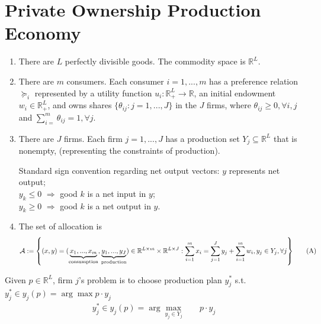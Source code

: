 \documentclass[11pt]{elegantbook}
\begin{document}
\section{Private Ownership Production Economy}
\begin{enumerate}
    \item There are $L$ perfectly divisible goods. The commodity space is $\mathbb{R}^L$.
    \item There are $m$ consumers. Each consumer $i=1,...,m$ has a preference relation $\succeq_i$ represented by a utility function $u_i: \mathbb{R}_+^L \rightarrow \mathbb{R}$, an initial endowment $w_i\in \mathbb{R}_+^L$, and owns shares $\{\theta_{ij}:j=1,...,J\}$ in the $J$ firms, where $\theta_{ij}\geq 0, \forall i,j$ and $\sum_{i=}^m\theta_{ij}=1, \forall j$.
    \item There are $J$ firms. Each firm $j=1,...,J$ has a production set $Y_j\subseteq \mathbb{R}^L$ that is nonempty, (representing the constraints of production).
    \begin{note}
        Standard sign convention regarding net output vectors: $y$ represents net output;\\
        $y_k\leq 0$ $\Rightarrow$ good $k$ is a net input in $y$;\\
        $y_k\geq 0$ $\Rightarrow$ good $k$ is a net output in $y$.
    \end{note}
    \item The set of allocation is
    \begin{equation}
        \begin{aligned}
            \mathcal{A}:=\left\{(x,y)=(\underbrace{x_1,...,x_m}_\textnormal{consumption},\underbrace{y_1,...,y_J}_\textnormal{production})\in \mathbb{R}^{L\times m}\times \mathbb{R}^{L\times J}: \sum_{i=1}^mx_i=\sum_{j=1}^J y_j+\sum_{i=1}^mw_i,y_j\in Y_j, \forall j\right\}
        \end{aligned}
        \tag{A}
        \label{A}
    \end{equation}
\end{enumerate}
Given $p\in \mathbb{R}^L$, firm $j$'s problem is to choose production plan $y_j^*$ s.t. $y_j^*\in y_j(p)=\arg\max p\cdot y_j$
\begin{equation}
    \begin{aligned}
        y_j^*\in y_j(p)=\arg\max_{y_j\in Y_j}\quad &p\cdot y_j
    \end{aligned}
    \tag{ystar}
    \label{eq:y_star}
\end{equation}
\end{document}
